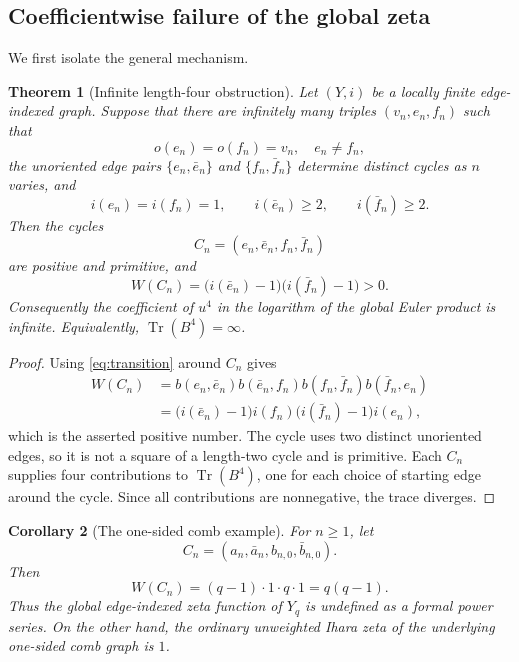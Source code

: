 \documentclass[11pt,reqno]{amsart}
\numberwithin{equation}{section}
\newtheorem{theorem}{Theorem}[section]
\newtheorem{corollary}[theorem]{Corollary}
\theoremstyle{definition}
\theoremstyle{remark}
\newcommand{\Tr}{\operatorname{Tr}}
\begin{document}
\subsection{Coefficientwise failure of the global zeta}
\label{sec:globalfail}

We first isolate the general mechanism.

\begin{theorem}[Infinite length-four obstruction]\label{thm:obstruction}
Let $(Y,i)$ be a locally finite edge-indexed graph.  Suppose that there are
infinitely many triples $(v_n,e_n,f_n)$ such that
\[
 o(e_n)=o(f_n)=v_n,\quad e_n\ne f_n,
\]
the unoriented edge pairs $\{e_n,\bar e_n\}$ and $\{f_n,\bar f_n\}$ determine
distinct cycles as $n$ varies, and
\[
 i(e_n)=i(f_n)=1,
 \qquad i(\bar e_n)\ge2,
 \qquad i(\bar f_n)\ge2.
\]
Then the cycles
\[
 C_n=(e_n,\bar e_n,f_n,\bar f_n)
\]
are positive and primitive, and
\[
 W(C_n)=\bigl(i(\bar e_n)-1\bigr)
         \bigl(i(\bar f_n)-1\bigr)>0.
\]
Consequently the coefficient of $u^4$ in the logarithm of the global Euler
product is infinite.  Equivalently, $\Tr(B^4)=\infty$.
\end{theorem}

\begin{proof}
Using \eqref{eq:transition} around $C_n$ gives
\begin{align*}
 W(C_n)
 &=b(e_n,\bar e_n)b(\bar e_n,f_n)
   b(f_n,\bar f_n)b(\bar f_n,e_n)\\
 &=\bigl(i(\bar e_n)-1\bigr)i(f_n)
   \bigl(i(\bar f_n)-1\bigr)i(e_n),
\end{align*}
which is the asserted positive number.  The cycle uses two distinct
unoriented edges, so it is not a square of a length-two cycle and is primitive.
Each $C_n$ supplies four contributions to $\Tr(B^4)$, one for each choice of
starting edge around the cycle.
Since all contributions are nonnegative, the trace diverges.
\end{proof}

\begin{corollary}[The one-sided comb example]\label{cor:combdiv}
For $n\ge1$, let
\[
 C_n=(a_n,\bar a_n,b_{n,0},\bar b_{n,0}).
\]
Then
\begin{equation}\label{eq:Cnweight}
 W(C_n)=(q-1)\cdot1\cdot q\cdot1=q(q-1).
\end{equation}
Thus the global edge-indexed zeta function of $Y_q$ is undefined as a formal
power series.  On the other hand, the ordinary unweighted Ihara zeta of the
underlying one-sided comb graph is $1$.
\end{corollary}
\end{document}
